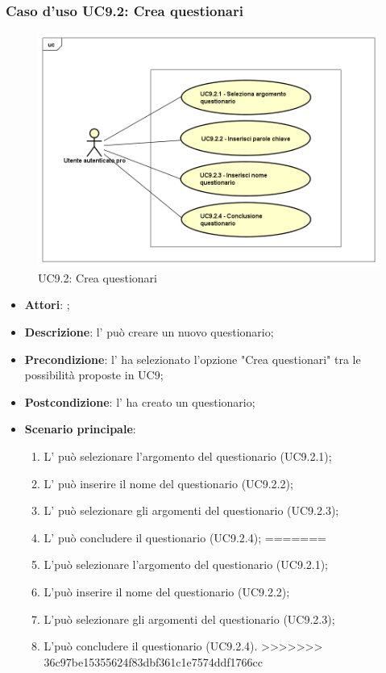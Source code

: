 	\subsubsection{Caso d'uso UC9.2: Crea questionari}
	\label{UC9.2}
	\begin{figure}[h]
		\centering
	\includegraphics[scale=0.5,keepaspectratio]{UML/UC9_2.png}
		\caption{UC9.2: Crea questionari}
	\end{figure}
	\FloatBarrier
	\begin{itemize}
		\item \textbf{Attori}: \uaupro{};
		\item \textbf{Descrizione}: l'\uaupro{} può creare un nuovo questionario; 
		\item \textbf{Precondizione}: l'\uaupro{} ha selezionato l'opzione "Crea questionari" tra le possibilità proposte in UC9;
		\item \textbf{Postcondizione}: l'\uaupro{} ha creato un questionario;
		\item \textbf{Scenario principale}:
			\begin{enumerate}
<<<<<<< HEAD
				\item L'\uaupro{} può selezionare l'argomento del questionario (UC9.2.1);
				\item L'\uaupro{} può inserire il nome del questionario (UC9.2.2);
				\item L'\uaupro{} può selezionare gli argomenti del questionario (UC9.2.3);
				\item L'\uaupro{} può concludere il questionario (UC9.2.4);
=======
				\item L'\uaupro può selezionare l'argomento del questionario (UC9.2.1);
				\item L'\uaupro può inserire il nome del questionario (UC9.2.2);
				\item L'\uaupro può selezionare gli argomenti del questionario (UC9.2.3);
				\item L'\uaupro può concludere il questionario (UC9.2.4).
>>>>>>> 36c97be15355624f83dbf361c1e7574ddf1766cc
			\end{enumerate}
		\end{itemize}
	
